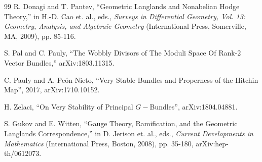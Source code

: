 \begin{thebibliography}{99}
R. Donagi and T. Pantev, ``Geometric Langlands and Nonabelian Hodge Theory,'' in H.-D. Cao et. al., eds., {\it Surveys in Differential Geometry, Vol. 13: Geometry,
Analysis, and Algebraic Geometry} (International Press, Somerville, MA, 2009), pp. 85-116.

S. Pal and C. Pauly, ``The Wobbly Divisors of The Moduli Space Of Rank-2 Vector Bundles,'' arXiv:1803.11315.


 C. Pauly and A. Pe{\'o}n-Nieto,
``Very Stable Bundles and Properness of the Hitchin Map'',
2017, arXiv:1710.10152.

 H. Zelaci,  
``On Very Stability of Principal $G-$Bundles'', 
 arXiv:1804.04881.



S. Gukov and E. Witten, ``Gauge Theory, Ramification, and the Geometric Langlands Correspondence,'' in D. Jerison et. al., eds., {\it 
Current Developments in Mathematics}  (International Press, Boston, 2008), pp. 35-180,
arXiv:hep-th/0612073.





\end{thebibliography}
